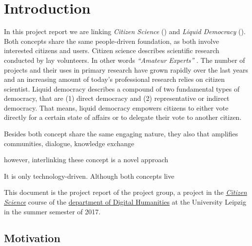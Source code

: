 \chapter{Introduction}
\label{ch:Introduction}


In this project report we are linking \textit{Citizen Science} () and \textit{Liquid Democracy} (). Both concepts share the same people-driven foundation, as both involve interested citizens and users. Citizen science describes scientific research conducted by lay volunteers. In other words \textit{“Amateur Experts”}  \parencite{Gura2013}. The number of  projects and their uses in primary research have grown rapidly over the last years \parencite{Kosmala2016} and an increasing amount of today’s professional research relies on citizen scientist. Liquid democracy describes a compound of two fundamental types of democracy, that are (1) direct democracy and (2) representative or indirect democracy. That means, liquid democracy empowers citizens to either vote directly for a certain state of affairs or to  delegate their vote to another citizen.

Besides both concept share the same engaging nature, they also that amplifies communities, dialogue, knowledge exchange

however, interlinking these concept is a novel approach

It is only technology-driven. Although both concepts live 


This document is the project report of the  project group, a project in the \href{http://www.dh.uni-leipzig.de/wo/courses/summer-semester-20142015/citizen-science/}{\textit{Citizen Science}} course of the \href{http://www.dh.uni-leipzig.de/wo/}{department of Digital Humanities} at the University Leipzig in the summer semester of 2017.

\section{Motivation}
\label{sec:Motivation}

